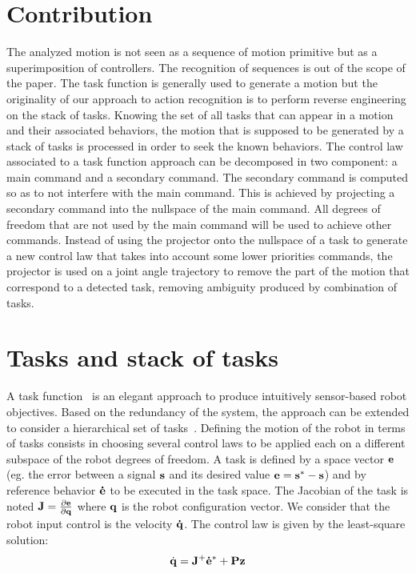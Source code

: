 \documentclass[letterpaper, 10pt, conference]{ieeeconf}      %
\begin{document}
\section{Contribution}

The analyzed motion is not seen as a sequence of motion primitive but as a
superimposition of controllers. The recognition of sequences
is out of the scope of the paper.
The task function is generally used to generate a motion but
the originality of our approach to action recognition is to perform
reverse engineering on the stack of tasks. 
Knowing the set of all tasks that can appear in a motion and their associated behaviors, 
the motion that is supposed to be generated by a stack of tasks is processed in order to
seek the known behaviors.
The control law associated to a task function approach can be decomposed in two component:
a main command and a secondary command.
The secondary command is computed so as to not interfere with the main command. This is achieved by
projecting a secondary command into the nullspace of the main command. All degrees of freedom
that are not used by the main command will be used to achieve other commands.
Instead of using the projector onto the nullspace of a task to generate a new control law that takes into
account some lower priorities commands, the projector is used on a joint angle trajectory
to remove the part of the motion that correspond to a detected task, removing
ambiguity produced by combination of tasks.\\

\section{Tasks and stack of tasks}
A task function~\cite{samson91} is an elegant approach to produce intuitively
sensor-based robot objectives. Based on the redundancy of the system, the
approach can be extended to consider a hierarchical set of
tasks~\cite{siciliano91}.  Defining the motion of the robot in terms of tasks
consists in choosing several control laws to be applied each on a different
subspace of the robot degrees of freedom. A task is defined by a space vector
${\mathbf{e}}$ (eg. the error between a signal ${\mathbf{s}}$ and its desired value
${\mathbf{e}}={\mathbf{s}}^* - {\mathbf{s}}$) and by reference behavior ${\mathbf{\dot{e}}}$ to be
executed in the task space. The Jacobian of the task is noted
${\mathbf{J}}=\frac{\partial{{\mathbf{e}}}}{\partial{{\mathbf{q}}}}$ where ${\mathbf{q}}$ is the robot
configuration vector.  We consider that the robot input control is the velocity
${\mathbf{\dot{q}}}$.  The control law is given by the least-square solution:
\begin{equation}
\dot{{\mathbf{q}}} = {\mathbf{J}}^+ {\mathbf{\dot{e}}}^* + {\mathbf{P}}{\mathbf{z}}
\end{equation}
\end{document}
